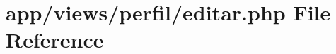 \hypertarget{perfil_2editar_8php}{}\section{app/views/perfil/editar.php File Reference}
\label{perfil_2editar_8php}
